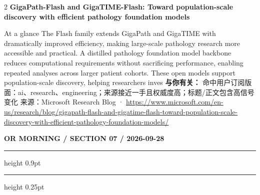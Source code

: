 \documentclass[10.5pt]{ctexart}
\begin{document}
\begin{multicols}{2}
\vspace{2mm}
{\large\bfseries GigaPath-Flash and GigaTIME-Flash: Toward population-scale discovery with efficient pathology foundation models}\par
At a glance The Flash family extends GigaPath and GigaTIME with dramatically improved efficiency, making large-scale pathology research more accessible and practical. A distilled pathology foundation model backbone reduces computational requirements without sacrificing performance, enabling repeated analyses across larger patient cohorts. These open models support population-scale discovery, helping researchers inves
\textbf{与你有关：} 命中用户订阅版面：ai、research、engineering；来源接近一手且权威度高；标题/正文包含高信号变化
{\footnotesize\color{ormuted} 来源：Microsoft Research Blog · \url{https://www.microsoft.com/en-us/research/blog/gigapath-flash-and-gigatime-flash-toward-population-scale-discovery-with-efficient-pathology-foundation-models/}}
\end{multicols}
\newpage
{\small\bfseries OR MORNING / SECTION 07 / 2026-09-28}
\vspace{2mm}
\hrule height 0.9pt
\vspace{1.5mm}
\hrule height 0.25pt
\vspace{4mm}
\end{document}
